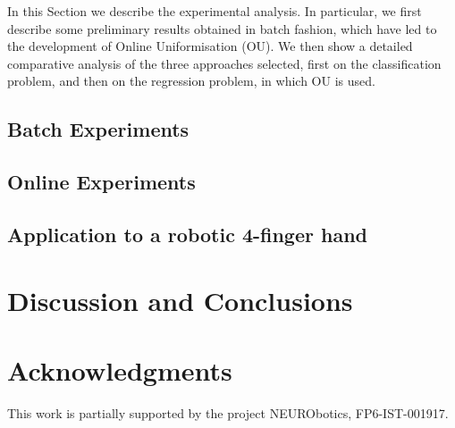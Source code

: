 \documentclass[twocolumn,referee]{svjour2}
\begin{document}
In this Section we describe the experimental analysis. In particular,
we first describe some preliminary results obtained in batch fashion,
which have led to the development of Online Uniformisation (OU). We
then show a detailed comparative analysis of the three approaches
selected, first on the classification problem, and then on the
regression problem, in which OU is used.

\subsection{Batch Experiments}
\label{subsec:strategy}


\subsection{Online Experiments}
\label{subsec:online}


\subsection{Application to a robotic 4-finger hand}
\label{subsec:application}


\section{Discussion and Conclusions}
\label{sec:discussion}


\section*{Acknowledgments}

This work is partially supported by the project NEURObotics,
FP6-IST-001917.

{\small

%

}


\end{document}
